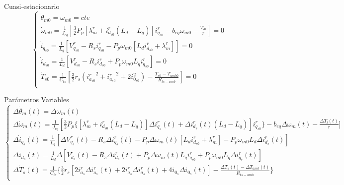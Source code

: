 \documentclass{article}
\begin{document}

Cuasi-estacionario
\begin{equation}
    \begin{cases}
        \dot{\theta}_{m0} = \omega_{m0} = cte\\
        \dot{\omega}_{m0} = \frac{1}{J_{eq}}[\frac{3}{2}P_{p}[\lambda_{m}^r+i_{d_{s0}}^r(L_{d}-L_{q})]i_{q_{s0}}^r - b_{eq}\omega_{m0} - \frac{T_{l0}}{r}] = 0\\
        \dot{i}_{q_{s0}} = \frac{1}{L_{q}}[V_{q_{s0}}^r - R_{s}i_{q_{s0}}^r - P_{p}\omega_{m0}[L_{d}i_{d_{s0}}^r+\lambda_{m}^r]] = 0\\
        \dot{i}_{d_{s0}} = \frac{1}{L_{d}}[V_{d_{s0}}^r - R_{s}i_{d_{s0}}^r + P_{p}\omega_{m0}L_{q}i_{q_{s0}}^r] = 0 \\
        \dot{T}_{s0} = \frac{1}{C_{ts}}[\frac{3}{2}r_{s}({i_{a_{s0}}^r}^2+{i_{a_{s0}}^r}^2+2i_{0_{s0}}^2)-\frac{T_{s0}-T_{amb0}}{R_{ts-amb}}] = 0\\
    \end{cases}
\end{equation}

Parámetros Variables
\begin{equation}
    \begin{cases}
        \Delta\dot{\theta}_{m}(t) = \Delta\omega_{m}(t)\\
        \Delta\dot{\omega}_{m}(t) = \frac{1}{J_{eq}}[\frac{3}{2}P_{p}\{[\lambda_{m}^r + i_{d_{s0}}^r(L_{d}-L_{q})]\Delta i_{q_{s}}^r(t) + \Delta i_{d_{s}}^r(t)(L_{d}-L_{q})]i_{q_{s0}}^r\}- b_{eq}\Delta\omega_{m}(t) - \frac{\Delta T_{l}(t)}{r}]\\
        \Delta\dot{i}_{q_{s}}(t) = \frac{1}{L_{q}}[\Delta V_{q_{s}}^r(t) - R_{s}\Delta i_{q_{s}}^r(t) - P_{p}\Delta\omega_{m}(t)[L_{d}i_{d_{s0}}^r+\lambda_{m}^r] - P_{p}\omega_{m0}L_{d}\Delta i_{d_{s}}^r(t)] \\
        \Delta\dot{i}_{d_{s}}(t) = \frac{1}{L_{d}}\Delta [V_{d_{s}}^r(t) - R_{s}\Delta i_{d_{s}}^r(t) + P_{p}\Delta\omega_{m}(t)L_{q}i_{q_{s0}}^r + P_{p}\omega_{m0}L_{q}\Delta i_{q_{s}}^r(t)]  \\
        \Delta\dot{T}_{s}(t) = \frac{1}{C_{ts}}\{\frac{3}{2}r_{s}[{2i_{a_{s}}^r\Delta i_{a_{s}}^r(t)} + 2i_{a_{s}}^r\Delta i_{a_{s}}^r(t)+4i_{0_{s}}\Delta i_{0_{s}}(t)]-\frac{\Delta T_{s}(t)-\Delta T_{amb}(t)}{R_{ts-amb}}\}\\
    \end{cases}
\end{equation}
\end{document}
